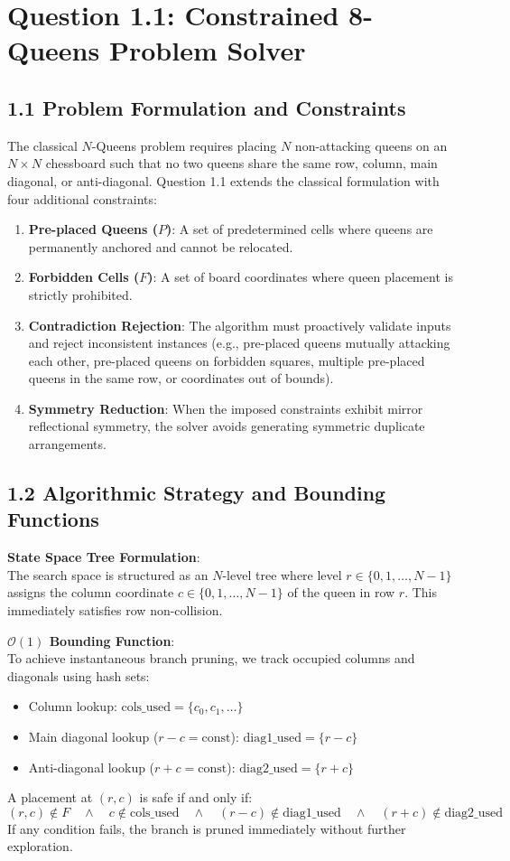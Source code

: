 \documentclass[12pt]{article}
\begin{document}
\section*{Question 1.1: Constrained 8-Queens Problem Solver}

\subsection*{1.1 Problem Formulation and Constraints}
The classical $N$-Queens problem requires placing $N$ non-attacking queens on an $N \times N$ chessboard such that no two queens share the same row, column, main diagonal, or anti-diagonal. Question 1.1 extends the classical formulation with four additional constraints:
\begin{enumerate}
    \item \textbf{Pre-placed Queens ($P$)}: A set of predetermined cells where queens are permanently anchored and cannot be relocated.
    \item \textbf{Forbidden Cells ($F$)}: A set of board coordinates where queen placement is strictly prohibited.
    \item \textbf{Contradiction Rejection}: The algorithm must proactively validate inputs and reject inconsistent instances (e.g., pre-placed queens mutually attacking each other, pre-placed queens on forbidden squares, multiple pre-placed queens in the same row, or coordinates out of bounds).
    \item \textbf{Symmetry Reduction}: When the imposed constraints exhibit mirror reflectional symmetry, the solver avoids generating symmetric duplicate arrangements.
\end{enumerate}

\subsection*{1.2 Algorithmic Strategy and Bounding Functions}
\textbf{State Space Tree Formulation}:\\
The search space is structured as an $N$-level tree where level $r \in \{0, 1, \dots, N-1\}$ assigns the column coordinate $c \in \{0, 1, \dots, N-1\}$ of the queen in row $r$. This immediately satisfies row non-collision.

\textbf{$\mathcal{O}(1)$ Bounding Function}:\\
To achieve instantaneous branch pruning, we track occupied columns and diagonals using hash sets:
\begin{itemize}
    \item Column lookup: $\text{cols\_used} = \{c_0, c_1, \dots\}$
    \item Main diagonal lookup ($r - c = \text{const}$): $\text{diag1\_used} = \{r - c\}$
    \item Anti-diagonal lookup ($r + c = \text{const}$): $\text{diag2\_used} = \{r + c\}$
\end{itemize}
A placement at $(r, c)$ is safe if and only if:
\[
(r, c) \notin F \quad \land \quad c \notin \text{cols\_used} \quad \land \quad (r - c) \notin \text{diag1\_used} \quad \land \quad (r + c) \notin \text{diag2\_used}
\]
If any condition fails, the branch is pruned immediately without further exploration.
\end{document}
